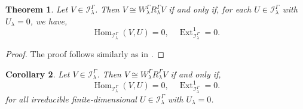 \documentclass[11pt]{amsart}
\theoremstyle{plain}
\newtheorem{thm}{Theorem}[section]
\newtheorem{cor}[thm]{Corollary}
\theoremstyle{definition}
\DeclareMathOperator{\Hom}{Hom}
\DeclareMathOperator{\Ext}{Ext}
\begin{document}
\begin{thm}
    Let $V\in \mathcal{I}_{\lambda}^{\Gamma}$. Then $V\cong W_{\lambda}^{\Gamma}R_{\lambda}^{\Gamma}V$ if and only if, for each $U\in\mathcal{I}_{\lambda}^{\Gamma}$ with $U_{\lambda}=0$, we have,
    \begin{equation}
        \Hom_{\mathcal{I}_{\lambda}^{\Gamma}}(V,U)=0, \quad \Ext^{1}_{\mathcal{I}_{\lambda}^{\Gamma}}=0.
    \end{equation}
\end{thm}
\begin{proof}
The proof follows similarly as in \cite[Theorem 4.10]{FMS15}.
\end{proof}
\begin{cor}\label{cor:3}
    Let $V\in \mathcal{I}_{\lambda}^{\Gamma}$. Then $V\cong W_{\lambda}^{\Gamma}R_{\lambda}^{\Gamma}V$ if and only if,
     \begin{equation}
        \Hom_{\mathcal{I}_{\lambda}^{\Gamma}}(V,U)=0, \quad \Ext^{1}_{\mathcal{I}_{\lambda}^{\Gamma}}=0.
    \end{equation}
     for all irreducible finite-dimensional $U\in\mathcal{I}^{\Gamma}_{\lambda}$ with $U_{\lambda}=0$. 
\end{cor}
\end{document}
